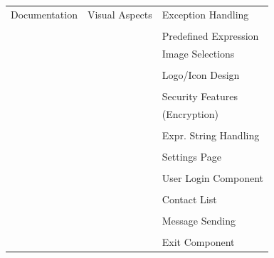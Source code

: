 \documentclass[29pt,a4paper]{moderncv}
\begin{document}
\begin{tabular}{| p{2.5in} | p{2.5in} | p{2.5in} |}
   				\\Documentation & Visual Aspects & Exception Handling\\
   				
   				\\ & & Predefined Expression \\ & & Image Selections\\
				
				\\ & & Logo/Icon Design\\
				
				\\ & & Security Features \\ & &(Encryption)\\
				
				\\ & & Expr. String Handling\\
				
				\\ & & Settings Page\\
				
				\\ & & User Login Component\\
				
				\\ & & Contact List\\
				
				\\ & & Message Sending\\
				
				\\ & & Exit Component\\
			\end{tabular}
			
\end{document}
